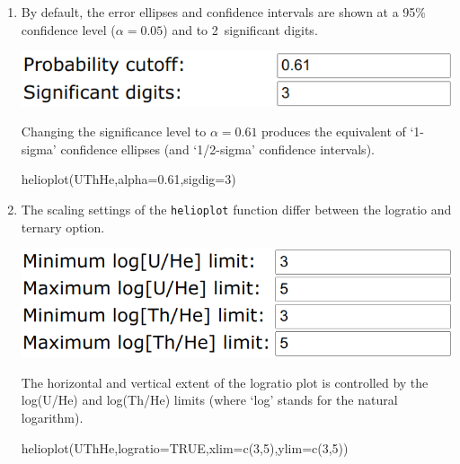 \begin{refsection}
\begin{enumerate}
\item By default, the error ellipses and confidence intervals are
  shown at a 95\% confidence level ($\alpha=0.05$) and to
  2~significant digits.

\noindent\begin{minipage}[t]{.5\linewidth}
\strut\vspace*{-\baselineskip}\newline
\includegraphics[width=\linewidth]{../figures/UThHealphasigdig.png}
\end{minipage}
\begin{minipage}[t]{.5\linewidth}
  Changing the significance level to $\alpha=0.61$ produces the
  equivalent of `1-sigma' confidence ellipses (and `1/2-sigma'
  confidence intervals).
\end{minipage}

\begin{console}
helioplot(UThHe,alpha=0.61,sigdig=3)
\end{console}

\item The scaling settings of the \texttt{helioplot} function differ
  between the logratio and ternary option.

\noindent\begin{minipage}[t]{.5\linewidth}
\strut\vspace*{-\baselineskip}\newline
\includegraphics[width=\linewidth]{../figures/UThHeLogratioLimits.png}
\end{minipage}
\begin{minipage}[t]{.5\linewidth}
  The horizontal and vertical extent of the logratio plot is
  controlled by the log(U/He) and log(Th/He) limits (where `log'
  stands for the natural logarithm).
\end{minipage}

\begin{console}
helioplot(UThHe,logratio=TRUE,xlim=c(3,5),ylim=c(3,5))
\end{console}


\end{enumerate}
\end{refsection}
